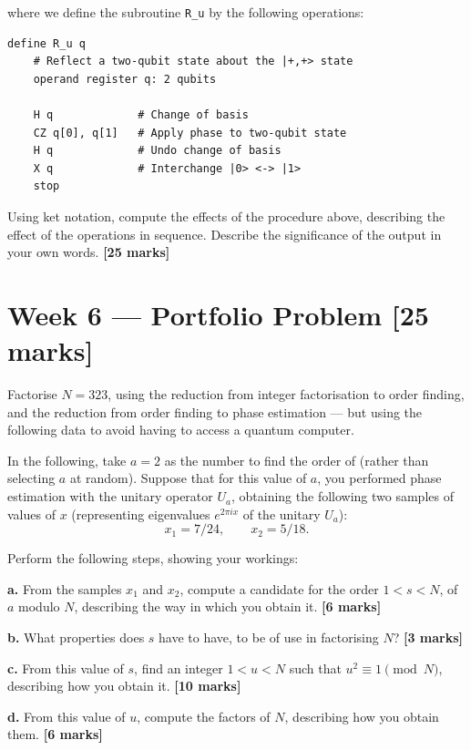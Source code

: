 \documentclass[12pt,a4paper]{article}
\begin{document}
where we define the subroutine \texttt{R\_u} by the following operations:

\begin{lstlisting}[style=pseudocode]
define R_u q
    # Reflect a two-qubit state about the |+,+> state
    operand register q: 2 qubits

    H q             # Change of basis
    CZ q[0], q[1]   # Apply phase to two-qubit state
    H q             # Undo change of basis
    X q             # Interchange |0> <-> |1>
    stop
\end{lstlisting}

Using ket notation, compute the effects of the procedure above, describing the effect of the
operations in sequence. Describe the significance of the output in your own words.
\hfill\textbf{[25 marks]}

\section*{Week 6 --- Portfolio Problem \hfill [25 marks]}

Factorise $N=323$, using the reduction from integer factorisation to order finding, and the
reduction from order finding to phase estimation --- but using the following data to avoid having
to access a quantum computer.

In the following, take $a=2$ as the number to find the order of (rather than selecting $a$ at
random). Suppose that for this value of $a$, you performed phase estimation with the unitary
operator $U_a$, obtaining the following two samples of values of $x$ (representing eigenvalues
$e^{2\pi ix}$ of the unitary $U_a$):
\[
  x_1 = 7/24, \qquad x_2 = 5/18.
\]

Perform the following steps, showing your workings:

\medskip
\textbf{a.}
From the samples $x_1$ and $x_2$, compute a candidate for the order $1<s<N$, of $a$ modulo $N$,
describing the way in which you obtain it.
\hfill\textbf{[6 marks]}

\medskip
\textbf{b.}
What properties does $s$ have to have, to be of use in factorising $N$?
\hfill\textbf{[3 marks]}

\medskip
\textbf{c.}
From this value of $s$, find an integer $1<u<N$ such that $u^2\equiv 1\pmod{N}$, describing how
you obtain it.
\hfill\textbf{[10 marks]}

\medskip
\textbf{d.}
From this value of $u$, compute the factors of $N$, describing how you obtain them.
\hfill\textbf{[6 marks]}
\end{document}
